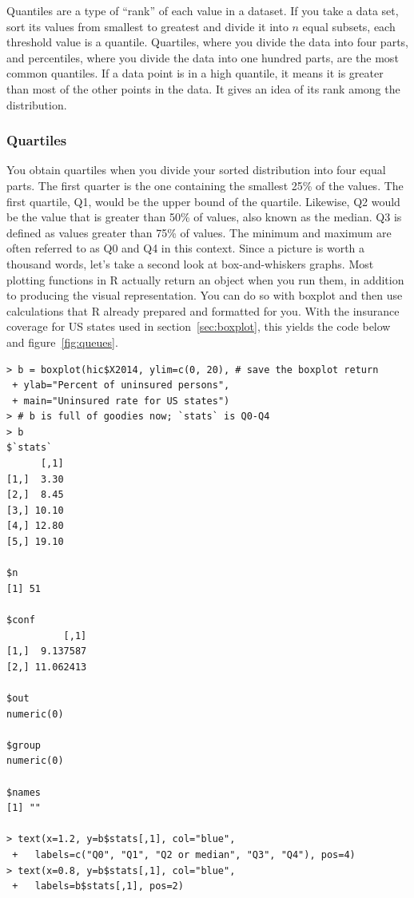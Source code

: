 \documentclass{report}
\newcommand{\code}[1]{\textsf{\ttfamily #1}}
\begin{document}
		Quantiles are a type of ``rank'' of each value in a dataset. If you take a data set, sort its values from smallest to greatest and divide it into $n$ equal subsets, each threshold value is a quantile. Quartiles, where you divide the data into four parts, and percentiles, where you divide the data into one hundred parts, are the most common quantiles. If a data point is in a high quantile, it means it is greater than most of the other points in the data. It gives an idea of its rank among the distribution.
		
		\subsubsection{Quartiles}
		You obtain quartiles when you divide your sorted distribution into four equal parts. The first quarter is the one containing the smallest 25\% of the values. The first quartile, Q1, would be the upper bound of the quartile. Likewise, Q2 would be the value that is greater than 50\% of values, also known as the median. Q3 is defined as values greater than 75\% of values. The minimum and maximum are often referred to as Q0 and Q4 in this context. Since a picture is worth a thousand words, let's take a second look at box-and-whiskers graphs. Most plotting functions in R actually return an object when you run them, in addition to producing the visual representation. You can do so with \code{boxplot} and then use calculations that R already prepared and formatted for you. With the insurance coverage for US states used in section~\ref{sec:boxplot}, this yields the code below and figure~\ref{fig:queues}.
		
		\begin{verbatim}
> b = boxplot(hic$X2014, ylim=c(0, 20), # save the boxplot return
 + ylab="Percent of uninsured persons", 
 + main="Uninsured rate for US states")
> # b is full of goodies now; `stats` is Q0-Q4
> b
$`stats`
      [,1]
[1,]  3.30
[2,]  8.45
[3,] 10.10
[4,] 12.80
[5,] 19.10

$n
[1] 51

$conf
          [,1]
[1,]  9.137587
[2,] 11.062413

$out
numeric(0)

$group
numeric(0)

$names
[1] ""

> text(x=1.2, y=b$stats[,1], col="blue",
 +   labels=c("Q0", "Q1", "Q2 or median", "Q3", "Q4"), pos=4)
> text(x=0.8, y=b$stats[,1], col="blue",
 +   labels=b$stats[,1], pos=2)
		\end{verbatim}
		
\end{document}
